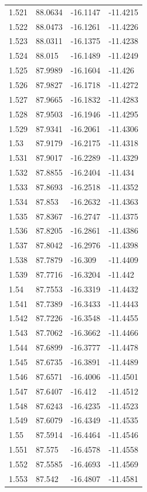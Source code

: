 \begin{tabular}{llll}
1.521 & 88.0634 & -16.1147 & -11.4215 \\
1.522 & 88.0473 & -16.1261 & -11.4226 \\
1.523 & 88.0311 & -16.1375 & -11.4238 \\
1.524 & 88.015 & -16.1489 & -11.4249 \\
1.525 & 87.9989 & -16.1604 & -11.426 \\
1.526 & 87.9827 & -16.1718 & -11.4272 \\
1.527 & 87.9665 & -16.1832 & -11.4283 \\
1.528 & 87.9503 & -16.1946 & -11.4295 \\
1.529 & 87.9341 & -16.2061 & -11.4306 \\
1.53 & 87.9179 & -16.2175 & -11.4318 \\
1.531 & 87.9017 & -16.2289 & -11.4329 \\
1.532 & 87.8855 & -16.2404 & -11.434 \\
1.533 & 87.8693 & -16.2518 & -11.4352 \\
1.534 & 87.853 & -16.2632 & -11.4363 \\
1.535 & 87.8367 & -16.2747 & -11.4375 \\
1.536 & 87.8205 & -16.2861 & -11.4386 \\
1.537 & 87.8042 & -16.2976 & -11.4398 \\
1.538 & 87.7879 & -16.309 & -11.4409 \\
1.539 & 87.7716 & -16.3204 & -11.442 \\
1.54 & 87.7553 & -16.3319 & -11.4432 \\
1.541 & 87.7389 & -16.3433 & -11.4443 \\
1.542 & 87.7226 & -16.3548 & -11.4455 \\
1.543 & 87.7062 & -16.3662 & -11.4466 \\
1.544 & 87.6899 & -16.3777 & -11.4478 \\
1.545 & 87.6735 & -16.3891 & -11.4489 \\
1.546 & 87.6571 & -16.4006 & -11.4501 \\
1.547 & 87.6407 & -16.412 & -11.4512 \\
1.548 & 87.6243 & -16.4235 & -11.4523 \\
1.549 & 87.6079 & -16.4349 & -11.4535 \\
1.55 & 87.5914 & -16.4464 & -11.4546 \\
1.551 & 87.575 & -16.4578 & -11.4558 \\
1.552 & 87.5585 & -16.4693 & -11.4569 \\
1.553 & 87.542 & -16.4807 & -11.4581 \\

\end{tabular}
